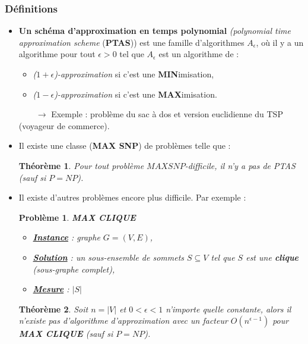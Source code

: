 \documentclass{article}
\newtheorem{thm}{Th\'eor\`eme}[section]
\newtheorem{pbm}{Problème}[section]
\begin{document}
\begin{sffamily}
\subsubsection{Définitions}

\begin{itemize}
\item \textbf{Un schéma d'approximation en temps polynomial} \textit{(polynomial
time approximation scheme} (\textbf{PTAS})) est une famille d'algorithmes
$A_\epsilon$, où il y a un algorithme pour tout $\epsilon > 0$ tel que
$A_\epsilon$ est un algorithme de :
\begin{itemize}
\item[*] \textit{($1+\epsilon$)-approximation} si c'est une
\textbf{MIN}imisation,
\item[*] \textit{($1-\epsilon$)-approximation} si c'est une
\textbf{MAX}imisation.
\end{itemize}
$\qquad \rightarrow$ Exemple : problème du sac à dos et version euclidienne du
TSP (voyageur de commerce).

\item Il existe une classe (\textbf{MAX SNP}) de problèmes telle que :
\begin{thm} Pour tout problème \textit{$MAX SNP$-difficile}, il n'y a pas de
PTAS (sauf si $P = NP$).
\end{thm}

\item Il existe d'autres problèmes encore plus difficile. Par exemple :\\
\indent \hbox{}
\begin{pbm} \textbf{MAX CLIQUE}
\begin{itemize}
\item[*]\textbf{\underline{Instance}} : graphe $G=(V,E)$,
\item[*]\textbf{\underline{Solution}} : un sous-ensemble de sommets $S
\subseteq V$ tel que $S$ est une \textbf{clique} \textit{(sous-graphe complet)},
\item[*]\textbf{\underline{Mesure}} : $|S|$
\end{itemize}
\indent \hbox{}
\end{pbm}

\begin{thm}Soit $n = |V|$ et $0 < \epsilon < 1$ n'importe quelle constante,
alors il n'existe pas d'algorithme d'approximation avec un facteur
$O(n^{\epsilon-1})$ pour \textbf{MAX CLIQUE} \textit{(sauf si $P = NP$)}.
\end{thm}


\end{itemize}
\end{sffamily}
\end{document}
